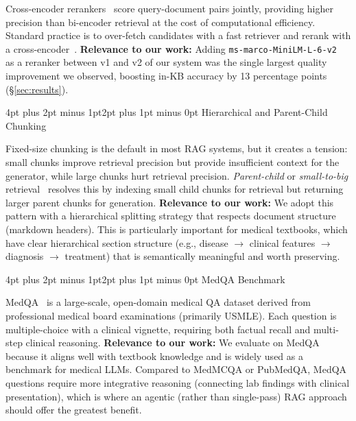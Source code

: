 \documentclass[10pt,twocolumn,letterpaper]{article}
\makeatletter
\renewcommand\subsection{\@startsection{subsection}{2}{\z@}%
  {4pt plus 2pt minus 1pt}{2pt plus 1pt minus 0pt}%
  {\normalsize\bfseries}}
\makeatother
\begin{document}
Cross-encoder rerankers~\cite{nogueira2019passage} score query-document pairs jointly, providing higher precision than bi-encoder retrieval at the cost of computational efficiency. Standard practice is to over-fetch candidates with a fast retriever and rerank with a cross-encoder~\cite{khattab2020colbert}. \textbf{Relevance to our work:} Adding \texttt{ms-marco-MiniLM-L-6-v2}~\cite{nogueira2019passage} as a reranker between v1 and v2 of our system was the single largest quality improvement we observed, boosting in-KB accuracy by 13 percentage points (\S\ref{sec:results}).

\subsection{Hierarchical and Parent-Child Chunking}

Fixed-size chunking is the default in most RAG systems, but it creates a tension: small chunks improve retrieval precision but provide insufficient context for the generator, while large chunks hurt retrieval precision. \emph{Parent-child} or \emph{small-to-big} retrieval~\cite{llamaindex2023parent} resolves this by indexing small child chunks for retrieval but returning larger parent chunks for generation. \textbf{Relevance to our work:} We adopt this pattern with a hierarchical splitting strategy that respects document structure (markdown headers). This is particularly important for medical textbooks, which have clear hierarchical section structure (e.g., disease $\to$ clinical features $\to$ diagnosis $\to$ treatment) that is semantically meaningful and worth preserving.

\subsection{MedQA Benchmark}

MedQA~\cite{jin2021disease} is a large-scale, open-domain medical QA dataset derived from professional medical board examinations (primarily USMLE). Each question is multiple-choice with a clinical vignette, requiring both factual recall and multi-step clinical reasoning. \textbf{Relevance to our work:} We evaluate on MedQA because it aligns well with textbook knowledge and is widely used as a benchmark for medical LLMs. Compared to MedMCQA or PubMedQA, MedQA questions require more integrative reasoning (connecting lab findings with clinical presentation), which is where an agentic (rather than single-pass) RAG approach should offer the greatest benefit.
\end{document}
